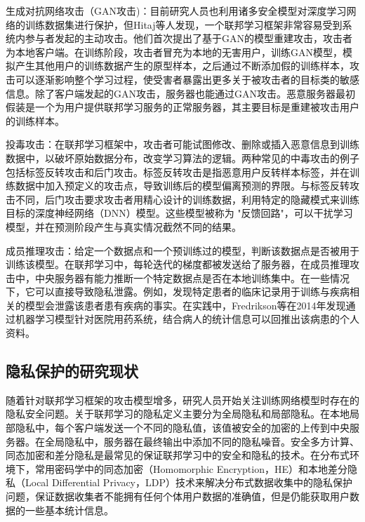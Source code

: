 生成对抗网络攻击（GAN攻击)：目前研究人员也利用诸多安全模型对深度学习网络的训练数据集进行保护，但Hitaj等人发现，一个联邦学习框架非常容易受到系统内参与者发起的主动攻击。他们首次提出了基于GAN的模型重建攻击，攻击者为本地客户端。在训练阶段，攻击者冒充为本地的无害用户，训练GAN模型，模拟产生其他用户的训练数据产生的原型样本，之后通过不断添加假的训练样本，攻击可以逐渐影响整个学习过程，使受害者暴露出更多关于被攻击者的目标类的敏感信息。除了客户端发起的GAN攻击，服务器也能通过GAN攻击。恶意服务器最初假装是一个为用户提供联邦学习服务的正常服务器，其主要目标是重建被攻击用户的训练样本。

投毒攻击：在联邦学习框架中，攻击者可能试图修改、删除或插入恶意信息到训练数据中，以破坏原始数据分布，改变学习算法的逻辑。两种常见的中毒攻击的例子包括标签反转攻击和后门攻击。标签反转攻击是指恶意用户反转样本标签，并在训练数据中加入预定义的攻击点，导致训练后的模型偏离预测的界限。与标签反转攻击不同，后门攻击要求攻击者用精心设计的训练数据，利用特定的隐藏模式来训练目标的深度神经网络（DNN）模型。这些模型被称为 "反馈回路"，可以干扰学习模型，并在预测阶段产生与真实情况截然不同的结果。

成员推理攻击：给定一个数据点和一个预训练过的模型，判断该数据点是否被用于训练该模型。在联邦学习中，每轮迭代的梯度都被发送给了服务器，在成员推理攻击中，中央服务器有能力推断一个特定数据点是否在本地训练集中。在一些情况下，它可以直接导致隐私泄露。例如，发现特定患者的临床记录用于训练与疾病相关的模型会泄露该患者患有疾病的事实。在实践中，Fredrikson等在2014年发现通过机器学习模型针对医院用药系统，结合病人的统计信息可以回推出该病患的个人资料。

\subsection{隐私保护的研究现状}
随着针对联邦学习框架的攻击模型增多，研究人员开始关注训练网络模型时存在的隐私安全问题。关于联邦学习的隐私定义主要分为全局隐私和局部隐私。在本地局部隐私中，每个客户端发送一个不同的隐私值，该值被安全的加密的上传到中央服务器。在全局隐私中，服务器在最终输出中添加不同的隐私噪音。安全多方计算、同态加密和差分隐私是最常见的保证联邦学习中的安全和隐私的技术。在分布式环境下，常用密码学中的同态加密（Homomorphic Encryption，HE）和本地差分隐私（Local Differential Privacy，LDP）技术来解决分布式数据收集中的隐私保护问题，保证数据收集者不能拥有任何个体用户数据的准确值，但是仍能获取用户数据的一些基本统计信息。

